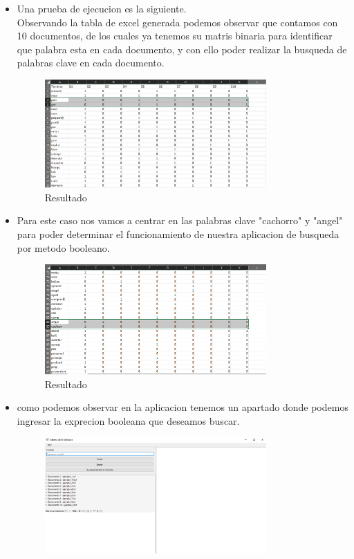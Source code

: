 \begin{itemize}
  \item Una prueba de ejecucion es la siguiente.\\ 
  Observando la tabla de excel generada podemos observar que contamos con 10 documentos, de los cuales ya tenemos su matris binaria para identificar que palabra esta en cada documento, y con ello poder realizar la busqueda de palabras clave en cada documento.
  \begin{figure}[ht]
    \centering
    \includegraphics[width=0.8\textwidth]{src/img/resultado/1.png}
    \caption{Resultado}
  \end{figure}
  \item Para este caso nos vamos a centrar en las palabras clave "cachorro" y "angel" para poder determinar el funcionamiento de nuestra aplicacion de busqueda por metodo booleano.
  \begin{figure}[ht]
    \centering
    \includegraphics[width=0.8\textwidth]{src/img/resultado/2.png}
    \caption{Resultado}
  \end{figure}
  \newpage
  \item como podemos observar en la aplicacion tenemos un apartado donde podemos ingresar la exprecion booleana que deseamos buscar.
  \begin{figure}[ht]
    \centering
    \includegraphics[width=0.8\textwidth]{src/img/resultado/3.png}

\end{figure}
\end{itemize}
